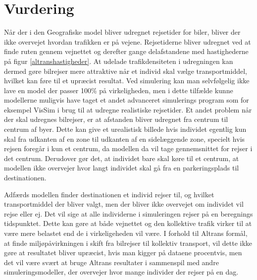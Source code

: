 

\section*{Vurdering}
Når der i den Geografiske model bliver udregnet rejsetider for biler, bliver der ikke overvejet hvordan trafikken er på vejene. Rejsetiderne bliver udregnet ved at finde ruten gennem vejnettet og derefter gange delafstandene med hastighederne på figur \ref{altranshastigheder}. At udelade trafikdensiteten i udregningen kan dermed gøre bilrejser mere attraktive når et individ skal vælge transportmiddel, hvilket kan føre til et upræcist resultat. Ved simulering kan man selvfølgelig ikke lave en model der passer 100\% på virkeligheden, men i dette tilfælde kunne modellerne muligvis have taget et andet advanceret simulerings program som for eksempel VisSim i brug til at udregne realistiske rejsetider. Et andet problem når der skal udregnes bilrejser, er at afstanden bliver udregnet fra centrum til centrum af byer. Dette kan give et urealistisk billede hvis individet egentlig kun skal fra udkanten af en zone til udkanten af en sidelæggende zone, specielt hvis rejsen foregår i kun et centrum, da modellen da vil tage gennemsnittet for rejser i det centrum. Derudover gør det, at individet bare skal køre til et centrum, at modellen ikke overvejer hvor langt individet skal gå fra en parkeringsplads til destinationen. 

\vspace{5mm}

Adfærds modellen finder destinationen et individ rejser til, og hvilket transportmiddel der bliver valgt, men der bliver ikke overvejet om individet vil rejse eller ej. Det vil sige at alle individerne i simuleringen rejser på en beregnings tidspunktet. Dette kan gøre at både vejnettet og den kollektive trafik virker til at være mere belastet end de i virkeligeheden vil være. I forhold til Altrans formål, at finde miljøpåvirkningen i skift fra bilrejser til kollektiv transport, vil dette ikke gøre at resultatet bliver upræcist, hvis man kigger på dataene procentvis, men det vil være svært at bruge Altrans resultater i sammenspil med andre simuleringsmodeller, der overvejer hvor mange individer der rejser på en dag.

